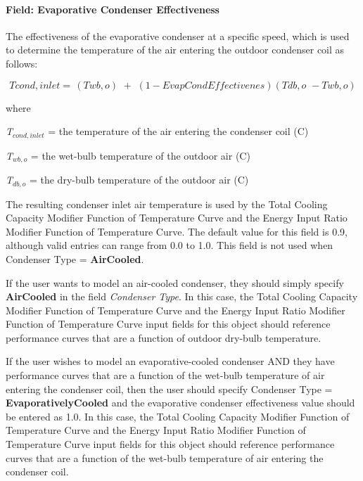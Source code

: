 \paragraph{Field: Evaporative Condenser Effectiveness}

The effectiveness of the evaporative condenser at a specific speed, which is used to determine the temperature of the air entering the outdoor condenser coil as follows:

\begin{equation}
Tcond,inlet = \,\left( {Twb,o} \right)\,\, + \,\,\left( {1 - EvapCondEffectivenes} \right)\left( {Tdb,o\,\, - Twb,o} \right)
\end{equation}

where

\emph{T\(_{cond,inlet}\)} = the temperature of the air entering the condenser coil (C)

\emph{T\(_{wb,o}\)} = the wet-bulb temperature of the outdoor air (C)

\emph{T\(_{db,o}\)} = the dry-bulb temperature of the outdoor air (C)

The resulting condenser inlet air temperature is used by the Total Cooling Capacity Modifier Function of Temperature Curve and the Energy Input Ratio Modifier Function of Temperature Curve. The default value for this field is 0.9, although valid entries can range from 0.0 to 1.0. This field is not used when Condenser Type = \textbf{AirCooled}.

If the user wants to model an air-cooled condenser, they should simply specify \textbf{AirCooled} in the field \textit{Condenser Type}. In this case, the Total Cooling Capacity Modifier Function of Temperature Curve and the Energy Input Ratio Modifier Function of Temperature Curve input fields for this object should reference performance curves that are a function of outdoor dry-bulb temperature.

If the user wishes to model an evaporative-cooled condenser AND they have performance curves that are a function of the wet-bulb temperature of air entering the condenser coil, then the user should specify Condenser Type = \textbf{EvaporativelyCooled} and the evaporative condenser effectiveness value should be entered as 1.0. In this case, the Total Cooling Capacity Modifier Function of Temperature Curve and the Energy Input Ratio Modifier Function of Temperature Curve input fields for this object should reference performance curves that are a function of the wet-bulb temperature of air entering the condenser coil.

